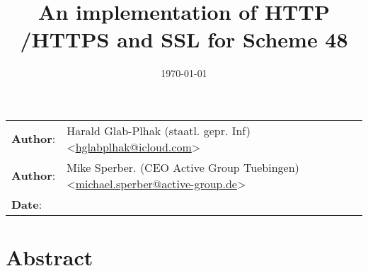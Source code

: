 \documentclass[10pt,a4paper,english]{article}
\title{An implementation of HTTP /HTTPS and SSL for Scheme 48 }
\author{}
\date{}
\newlength{\docinfowidth}
\begin{document}
\maketitle

\begin{center}
\begin{tabularx}{\docinfowidth}{lX}
\textbf{Author}: &
	Harald Glab-Plhak  (staatl. gepr. Inf){\textless}\href{mailto:hglabplhak@icloud.com}{hglabplhak@icloud.com}{\textgreater} \\
\textbf{Author}: &
	Mike Sperber. (CEO Active Group Tuebingen) {\textless}\href{mailto:michael.sperber@active-group.de}{michael.sperber@active-group.de}{\textgreater} \\
\textbf{Date}: &
\date{\today{}}\\
\end{tabularx}
\end{center}

\maketitle
\tableofcontents

\section{Abstract}
\end{document}
